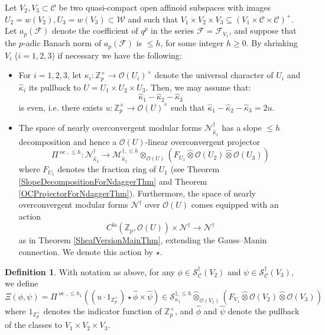 \documentclass[10pt, oneside]{amsart}
\numberwithin{equation}{subsection}
\theoremstyle{definition}
\newtheorem{definition}[equation]{Definition}
\theoremstyle{remark}
\newcommand{\mbb}[1]{\mathbb{#1}}
\newcommand{\hatot}{\hat{\otimes}}
\newcommand{\opn}[1]{\operatorname{#1}}
\begin{document}
Let $V_2, V_3 \subset \mathcal{C}$ be two quasi-compact open affinoid subspaces with images $U_2 = w(V_2), U_3 = w(V_3) \subset \mathcal{W}$ and such that $V_1 \times V_2 \times V_3 \subseteq (V_1 \times \mathcal{C} \times \mathcal{C})^+$. Let $a_p(\mathcal{F})$ denote the coefficient of $q^p$ in the series $\mathcal{F} = \mathcal{F}_{V_1}$, and suppose that the $p$-adic Banach norm of $a_p(\mathcal{F})$ is $\leq h$, for some integer $h \geq 0$. By shrinking $V_i$ ($i=1, 2, 3$) if necessary we have the following:
\begin{itemize}
    \item For $i=1, 2, 3$, let $\kappa_i \colon \mbb{Z}_p^{\times} \to \mathcal{O}(U_i)^{\times}$ denote the universal character of $U_i$ and $\hat{\kappa}_i$ its pullback to $U = U_1 \times U_2 \times U_3$. Then, we may assume that: 
    \[
    \hat{\kappa}_1 - \hat{\kappa}_2 - \hat{\kappa}_3
    \]
    is even, i.e. there exists $u \colon \mbb{Z}_p^{\times} \to \mathcal{O}(U)^{\times}$ such that $\hat{\kappa}_1 - \hat{\kappa}_2 - \hat{\kappa}_3 = 2u$.
    \item The space of nearly overconvergent modular forms $\mathscr{N}^{\dagger}_{\hat{\kappa}_1}$ has a slope $\leq h$ decomposition and hence a $\mathcal{O}(U)$-linear overconvergent projector 
    \[
    \Pi^{\opn{oc}, \leq h} \colon \mathscr{N}^{\dagger}_{\hat{\kappa}_1} \to \mathscr{M}^{\dagger, \leq h}_{\hat{\kappa}_1} \otimes_{\mathcal{O}(U)} (F_{U_1} \hatot \mathcal{O}(U_2) \hatot \mathcal{O}(U_3) )
    \]
    where $F_{U_1}$ denotes the fraction ring of $U_1$ (see Theorem \ref{SlopeDecompositionForNdaggerThm} and Theorem \ref{OCProjectorForNdaggerThm}). Furthermore, the space of nearly overconvergent modular forms $\mathscr{N}^{\dagger}$ over $\mathcal{O}(U)$ comes equipped with an action
    \[
    C^{\opn{la}}(\mbb{Z}_p, \mathcal{O}(U)) \times \mathscr{N}^{\dagger} \to \mathscr{N}^{\dagger} 
    \]
    as in Theorem \ref{SheafVersionMainThm}, extending the Gauss--Manin connection. We denote this action by $\star$.
\end{itemize}

\begin{definition} \label{DefXiBilinearPairing}
With notation as above, for any $\phi \in \mathcal{S}^{\dagger}_{\mathcal{C}}(V_2)$ and $\psi \in \mathcal{S}^{\dagger}_{\mathcal{C}}(V_3)$, we define
\[
\Xi (\phi, \psi) = \Pi^{\opn{oc}, \leq h_1}( (u \cdot 1_{\mbb{Z}_p^{\times}}) \star \hat{\phi} \times \hat{\psi} ) \in \mathscr{S}^{\dagger, \leq h}_{\kappa_1} \hatot_{\mathcal{O}(V_1)} \left( F_{V_1} \hat{\otimes} \mathcal{O}(V_2) \hat{\otimes} \mathcal{O}(V_3)\right)
\]
where $1_{\mbb{Z}_p^{\times}}$ denotes the indicator function of $\mbb{Z}_p^{\times}$, and $\hat{\phi}$ and $\hat{\psi}$ denote the pullback of the classes to $V_1 \times V_2 \times V_3$.
\end{definition}
\end{document}
